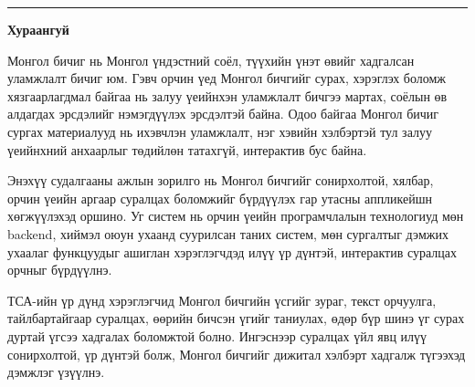 
\vspace*{-1cm}
\noindent\rule{\textwidth}{0.4pt}
\vspace{0.8cm}

\begin{center}
{\Large\textbf{\ttitle}\par}
\bigskip
{\scshape\Large \deptname\par}
\bigskip

{\large \shortname\par}
{\Large\textbf{Хураангуй}\par}

{\normalsize \par}
\end{center}
\vspace{1cm}


\bigskip


Монгол бичиг нь Монгол үндэстний соёл, түүхийн үнэт өвийг хадгалсан уламжлалт бичиг юм. Гэвч орчин үед Монгол бичгийг сурах, хэрэглэх боломж хязгаарлагдмал байгаа нь залуу үеийнхэн уламжлалт бичгээ мартах, соёлын өв алдагдах эрсдэлийг нэмэгдүүлэх эрсдэлтэй байна. Одоо байгаа Монгол бичиг сургах материалууд нь ихэвчлэн уламжлалт, нэг хэвийн хэлбэртэй тул залуу үеийнхний анхаарлыг төдийлөн татахгүй, интерактив бус байна.

Энэхүү судалгааны ажлын зорилго нь Монгол бичгийг сонирхолтой, хялбар, орчин үеийн аргаар суралцах боломжийг бүрдүүлэх гар утасны аппликейшн хөгжүүлэхэд оршино. Уг систем нь орчин үеийн програмчлалын технологиуд мөн backend, хиймэл оюун ухаанд суурилсан таних систем, мөн сургалтыг дэмжих ухаалаг функцуудыг ашиглан хэрэглэгчдэд илүү үр дүнтэй, интерактив суралцах орчныг бүрдүүлнэ.

ТСА-ийн үр дүнд хэрэглэгчид Монгол бичгийн үсгийг зураг, текст орчуулга, тайлбартайгаар суралцах, өөрийн бичсэн үгийг таниулах, өдөр бүр шинэ үг сурах дуртай үгсээ хадгалах боломжтой болно. Ингэснээр суралцах үйл явц илүү сонирхолтой, үр дүнтэй болж, Монгол бичгийг дижитал хэлбэрт хадгалж түгээхэд дэмжлэг үзүүлнэ.


\vfill